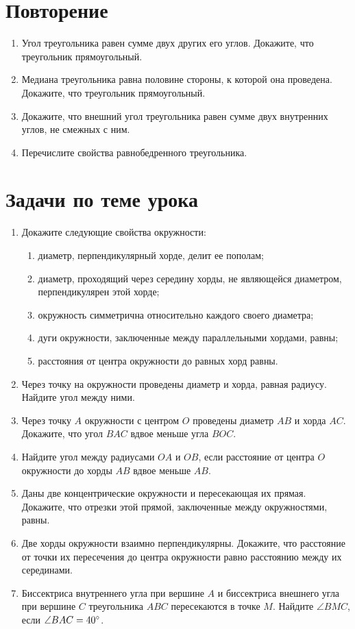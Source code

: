 \documentclass[12pt, a4paper]{article}
\begin{document}
	
  
\section{Повторение}
\begin{enumerate}
	\item Угол треугольника равен сумме двух других его углов. Докажите, что треугольник прямоугольный.
	\item Медиана треугольника равна половине стороны, к которой она проведена. Докажите, что треугольник прямоугольный.
	\item Докажите, что внешний угол треугольника равен сумме двух внутренних углов, не смежных с ним.
	\item Перечислите свойства равнобедренного треугольника.
\end{enumerate}
\section{Задачи по теме урока}
\begin{enumerate}
	\item Докажите следующие свойства окружности:
		\begin{enumerate}[label=\asbuk*)]
		\item  диаметр, перпендикулярный хорде, делит ее пополам;
		\item  диаметр, проходящий через середину хорды, не являющейся диаметром, перпендикулярен этой хорде;
		\item окружность симметрична относительно каждого своего
		диаметра;
		\item  дуги окружности, заключенные между параллельными
		хордами, равны;
		\item  расстояния от центра окружности до равных хорд равны.
		\end{enumerate}
	\item Через точку на окружности проведены диаметр и хорда, равная радиусу. Найдите угол между ними.
	\item Через точку $A$ окружности с центром $O$ проведены диаметр $AB$ и хорда $AC$. Докажите, что угол $BAC$ вдвое меньше угла $BOC$.
	\item Найдите угол между радиусами $OA$ и $OB$, если расстояние от центра $O$ окружности до хорды $AB$ вдвое меньше $AB$.
	\item Даны две концентрические окружности и пересекающая их прямая. Докажите, что отрезки этой прямой, заключенные между окружностями, равны.
	\item Две хорды окружности взаимно перпендикулярны. Докажите, что расстояние от точки их пересечения до центра окружности равно расстоянию между их серединами.
	\item Биссектриса внутреннего угла при вершине $A$ и биссектриса внешнего угла при вершине $C$ треугольника $ABC$ пересекаются в точке $M$. Найдите $\angle BMC$, если $\angle BAC = 40\degree$.
\end{enumerate}
\end{document}
